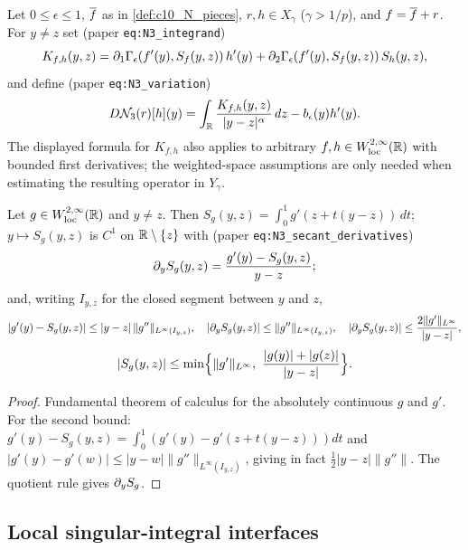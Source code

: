 \begin{definition}[Linearization of $\mc N_3$]
  \label{def:c10_N3_linearization}
  Let $0\le\epsilon\le1$, $\overline{f}$ as in \cref{def:c10_N_pieces}, $r,h\in X_\gamma$ ($\gamma>1/p$), and
  $f=\overline{f}+r$. For $y\ne z$ set (paper \texttt{eq:N3\_integrand})
  \[
    K_{f,h}(y,z)=\partial_1\Gamma_\epsilon(f'(y),S_f(y,z))\,h'(y)+\partial_2\Gamma_\epsilon(f'(y),S_f(y,z))\,S_h(y,z),
  \]
  and define (paper \texttt{eq:N3\_variation})
  \[
    D\mathcal{N}_3(r)[h](y)=\int_{\mathbb{R}}\frac{K_{f,h}(y,z)}{|y-z|^\alpha}\,dz-b_\epsilon(y)h'(y).
  \]
  The displayed formula for $K_{f,h}$ also applies to arbitrary
  $f,h\in W^{2,\infty}_{\mathrm{loc}}(\mathbb{R})$ with bounded first derivatives; the weighted-space
  assumptions are only needed when estimating the resulting operator in $Y_\gamma$.
\end{definition}

\begin{lemma}
  \label{lem:c10_secant_identities}
  Let $g\in W^{2,\infty}_{\mathrm{loc}}(\mathbb{R})$ and $y\ne z$. Then
  $S_g(y,z)=\int_0^1g'(z+t(y-z))\,dt$; $y\mapsto S_g(y,z)$ is $C^1$ on $\mathbb{R}\setminus\{z\}$ with
  (paper \texttt{eq:N3\_secant\_derivatives})
  \[
    \partial_yS_g(y,z)=\frac{g'(y)-S_g(y,z)}{y-z};
  \]
  and, writing $I_{y,z}$ for the closed segment between $y$ and $z$,
  \[
    |g'(y)-S_g(y,z)|\le|y-z|\,\|g''\|_{L^\infty(I_{y,z})},\quad
    |\partial_yS_g(y,z)|\le\|g''\|_{L^\infty(I_{y,z})},\quad
    |\partial_yS_g(y,z)|\le\frac{2\|g'\|_{L^\infty}}{|y-z|},
  \]
  \[
    |S_g(y,z)|\le\min\Bigl\{\|g'\|_{L^\infty},\ \frac{|g(y)|+|g(z)|}{|y-z|}\Bigr\}.
  \]
\end{lemma}
\begin{proof}
  Fundamental theorem of calculus for the absolutely continuous $g$ and $g'$. For the second bound:
  $g'(y)-S_g(y,z)=\int_0^1(g'(y)-g'(z+t(y-z)))dt$ and $|g'(y)-g'(w)|\le|y-w|\|g''\|_{L^\infty(I_{y,z})}$,
  giving in fact $\frac12|y-z|\|g''\|$. The quotient rule gives $\partial_yS_g$.
\end{proof}

\subsection{Local singular-integral interfaces}

